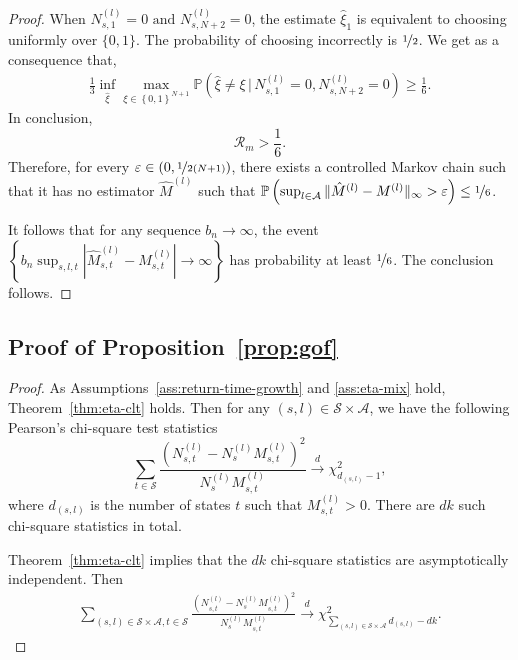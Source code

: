 \documentclass[twoside,11pt]{article}
\newcommand{\pow}[1]{^{(#1)}}%
\numberwithin{equation}{section}
\newcommand{\lp}{\left(}
\newcommand{\rp}{\right)}
\newcommand{\lc}{\left\{}
\newcommand{\rc}{\right\}}
\newcommand{\lv}{\left|}
\newcommand{\rv}{\right|}
\newcommand{\Pbb}{\mathbb{P}}
\newcommand{\Rcal}{\mathcal{R}}
\newcommand{\prob}{\Pbb}
\newcommand{\gn}{\, | \,}
\newcommand{\eps}{\varepsilon}
\renewcommand{\epsilon}{\eps}
\begin{document}
\begin{proof}
When $N_{s,1} \pow l = 0 \text{ and } N_{s,N+2} \pow l = 0$, the estimate $\hat \xi_1$ is equivalent to choosing uniformly over $\{0, 1\}$.
The probability of choosing incorrectly is $\nicefrac{1}{2}$. 
We get as a consequence that,
\begin{align*}
\frac{1}{3} \inf_{\hat \xi} \max_{\xi\in\lc0,1\rc^{N+1}}
  \prob\lp\hat \xi \neq \xi \gn N_{s,1} \pow l = 0, N_{s,N+2} \pow l = 0\rp \geq \frac{1}{6}.
\end{align*}
In conclusion, 
\[
    \Rcal_m > \frac{1}{6}.
\]
Therefore, for every $\epsilon \in (0, \nicefrac{1}{2(N+1)})$, there exists a controlled Markov chain such that it has no estimator $\hat M\pow l$ such that $\prob\lp  \sup_{l\in \mathcal A}\| \hat M\pow l-M\pow l \|_\infty>\eps\rp \leq \nicefrac{1}{6}$.

It follows that for any sequence $b_n\rightarrow\infty$, the event $\lc b_n\sup_{s,l,t} \lv \hat M_{s,t}\pow l-M_{s,t}\pow l\rv\rightarrow\infty\rc$ has probability at least $\nicefrac{1}{6}$. The conclusion follows.
\end{proof}

\subsection{Proof of Proposition~\ref{prop:gof}}
\label{sec:proof-GOF}
\begin{proof}
As Assumptions~\ref{ass:return-time-growth} and \ref{ass:eta-mix} hold, Theorem~\ref{thm:eta-clt} holds.
Then for any $(s,l) \in \mathcal S \times \mathcal A$, we have the following Pearson's chi-square test statistics
\[
    \sum_{t \in \mathcal S} \frac{\lp N_{s,t} \pow l - N_s \pow l M_{s,t} \pow l \rp^2}{N_s \pow l M_{s,t} \pow l}\overset{d}{\rightarrow} \chi^2_{d_{(s,l)} - 1},
\]
where $d_{(s,l)}$ is the number of states $t$ such that $M_{s,t} \pow l > 0$.
There are $dk$ such chi-square statistics in total.

Theorem~\ref{thm:eta-clt} implies that the $dk$ chi-square statistics are asymptotically independent.
Then
\begin{align*}
    \sum_{(s, l) \in \mathcal S \times \mathcal A, t \in \mathcal S} \frac{\lp N_{s,t} \pow l - N_s \pow l M_{s,t} \pow l \rp^2}{N_s \pow l M_{s,t} \pow l} \overset{d}{\rightarrow} \chi^2_{\sum_{(s,l) \in \mathcal S \times \mathcal A} d_{(s,l)} - dk}.
\end{align*}
\end{proof}


% 
\end{document}
